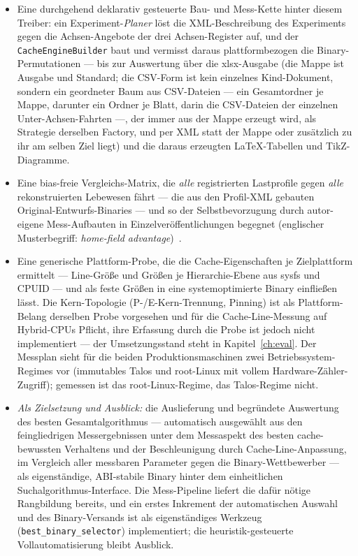 \begin{itemize}
  Kapitel~\ref{ch:eval} ausweist --- und drei Granularitäten: Mikro-, Makro- und Gesamt-Benchmarking
  (einzelne Bestandteile, Interface-Operationen, ganze Algorithmen).
  \item Eine durchgehend deklarativ gesteuerte Bau- und Mess-Kette hinter diesem Treiber: ein
  Experiment-\emph{Planer} löst die XML-Beschreibung des Experiments gegen die Achsen-Angebote der
  drei Achsen-Register auf, und der \texttt{CacheEngineBuilder} baut und vermisst daraus
  plattformbezogen die Binary-Permutationen --- bis zur Auswertung über die xlsx-Ausgabe (die Mappe
  ist Ausgabe und Standard; die CSV-Form ist kein einzelnes Kind-Dokument, sondern ein geordneter Baum aus
  CSV-Dateien --- ein Gesamtordner je Mappe, darunter ein Ordner je Blatt, darin die CSV-Dateien der
  einzelnen Unter-Achsen-Fahrten ---, der immer aus der Mappe erzeugt wird, als Strategie derselben Factory,
  und per XML statt der Mappe oder zusätzlich zu ihr am selben Ziel liegt) und die daraus erzeugten
  LaTeX-Tabellen und TikZ-Diagramme.
  \item Eine bias-freie Vergleichs-Matrix, die \emph{alle} registrierten Lastprofile gegen \emph{alle}
  rekonstruierten Lebewesen fährt --- die aus den Profil-XML gebauten Original-Entwurfs-Binaries --- und
  so der Selbstbevorzugung durch autor-eigene Mess-Aufbauten in Einzelveröffentlichungen begegnet
  (englischer Musterbegriff: \emph{home-field advantage})~\cite{vanderkouwe2019benchmarking}.
  \item Eine generische Plattform-Probe, die die Cache-Eigenschaften je Zielplattform ermittelt ---
  Line-Größe und Größen je Hierarchie-Ebene aus sysfs und CPUID --- und als feste Größen in eine
  systemoptimierte Binary einfließen lässt. Die Kern-Topologie (P-/E-Kern-Trennung, Pinning) ist als
  Plattform-Belang derselben Probe vorgesehen und für die Cache-Line-Messung auf Hybrid-CPUs Pflicht,
  ihre Erfassung durch die Probe ist jedoch nicht implementiert --- der Umsetzungsstand steht in
  Kapitel~\ref{ch:eval}. Der Messplan sieht für die beiden Produktionsmaschinen zwei Betriebssystem-Regimes
  vor (immutables Talos und root-Linux mit vollem Hardware-Zähler-Zugriff); gemessen ist das
  root-Linux-Regime, das Talos-Regime nicht.
  \item \emph{Als Zielsetzung und Ausblick:} die Auslieferung und begründete Auswertung des besten
  Gesamtalgorithmus --- automatisch ausgewählt aus den feingliedrigen Messergebnissen unter dem
  Messaspekt des besten cache-bewussten Verhaltens und der Beschleunigung durch Cache-Line-Anpassung, im
  Vergleich aller messbaren Parameter gegen die Binary-Wettbewerber --- als eigenständige, ABI-stabile
  Binary hinter dem einheitlichen Suchalgorithmus-Interface. Die Mess-Pipeline liefert die dafür
  nötige Rangbildung bereits, und ein erstes Inkrement der automatischen Auswahl und des
  Binary-Versands ist als eigenständiges Werkzeug (\texttt{best\_binary\_selector}) implementiert;
  die heuristik-gesteuerte Vollautomatisierung bleibt Ausblick.
\end{itemize}

